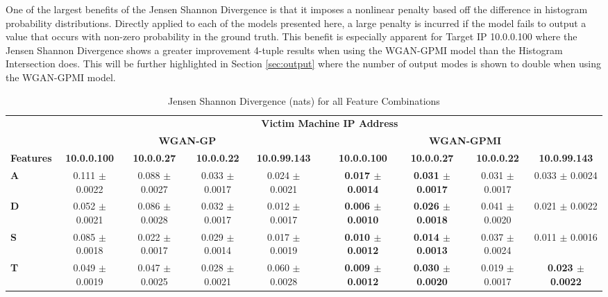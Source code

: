 One of the largest benefits of the Jensen Shannon Divergence is that it imposes a nonlinear penalty based off the difference in histogram probability distributions. Directly applied to each of the models presented here, a large penalty is incurred if the model fails to output a value that occurs with non-zero probability in the ground truth. This benefit is especially apparent for Target IP 10.0.0.100 where the Jensen Shannon Divergence shows a greater improvement 4-tuple results when using the WGAN-GPMI model than the Histogram Intersection does. This will be further highlighted in Section \ref{sec:output} where the number of output modes is shown to double when using the WGAN-GPMI model.

\begin{table}[!htbp]
	\caption{Jensen Shannon Divergence (nats) for all Feature Combinations}
	\label{tab:jsd}
	\centering
	\begin{adjustbox}{angle=90}
		\begin{tabular}{l|c|c|c|c|c|c|c|c|c|}
			\multicolumn{1}{c|}{} & \multicolumn{9}{c|}{\textbf{Victim Machine IP Address}} \\
			\multicolumn{1}{c|}{} & \multicolumn{4}{c|}{\textbf{WGAN-GP}} &  & \multicolumn{4}{c|}{\textbf{WGAN-GPMI}} \\
			\multicolumn{1}{c|}{\textbf{Features}} & \textbf{10.0.0.100} & \textbf{10.0.0.27} & \textbf{10.0.0.22} & \textbf{10.0.99.143} & \textbf{} & \textbf{10.0.0.100} & \textbf{10.0.0.27} & \textbf{10.0.0.22} & \textbf{10.0.99.143} \\ \hline
			\textbf{A} & 0.111 $\pm$ 0.0022& 0.088 $\pm$ 0.0027 & 0.033 $\pm$ 0.0017 & 0.024 $\pm$ 0.0021 &  & \textbf{0.017 $\pm$ 0.0014} & \textbf{0.031 $\pm$ 0.0017} & 0.031  $\pm$ 0.0017 & 0.033 $\pm$ 0.0024 \\
			\textbf{D} & 0.052 $\pm$ 0.0021& 0.086 $\pm$ 0.0028 & 0.032 $\pm$ 0.0017 & 0.012 $\pm$ 0.0017 &  & \textbf{0.006 $\pm$ 0.0010} & \textbf{0.026 $\pm$ 0.0018} & 0.041  $\pm$ 0.0020 & 0.021 $\pm$ 0.0022 \\
			\textbf{S} & 0.085 $\pm$ 0.0018& 0.022 $\pm$ 0.0017 & 0.029 $\pm$ 0.0014 & 0.017 $\pm$ 0.0019 &  & \textbf{0.010 $\pm$ 0.0012} & \textbf{0.014 $\pm$ 0.0013} & 0.037  $\pm$ 0.0024 & 0.011 $\pm$ 0.0016 \\
			\textbf{T} & 0.049 $\pm$ 0.0019& 0.047 $\pm$ 0.0025 & 0.028 $\pm$ 0.0021 & 0.060 $\pm$ 0.0028 &  & \textbf{0.009 $\pm$ 0.0012} & \textbf{0.030 $\pm$ 0.0020} & 0.019  $\pm$ 0.0017 & \textbf{0.023 $\pm$ 0.0022} \\ \hline

\end{tabular}
\end{adjustbox}
\end{table}
